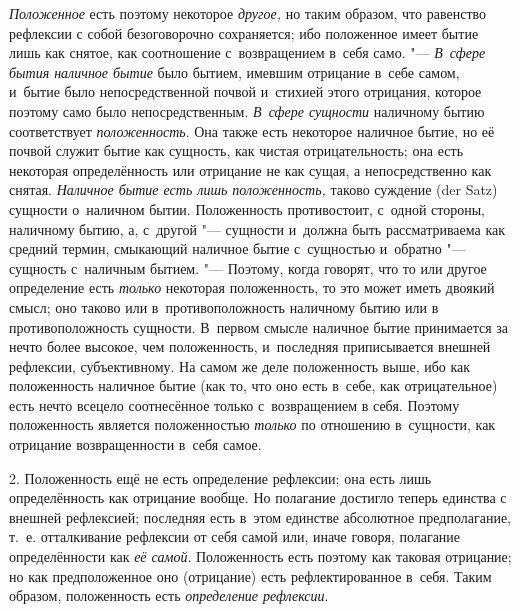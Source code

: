{\em Положенное} есть поэтому некоторое
{\em другое,} но таким образом, что равенство рефлексии
с собой безоговорочно сохраняется; ибо положенное имеет бытие лишь как
снятое, как соотношение с~возвращением в~себя само. "---
{\em В~сфере бытия наличное бытие} было бытием, имевшим
отрицание в~себе самом, и~бытие было непосредственной почвой и~стихией
этого отрицания, которое поэтому само было непосредственным.
{\em В~сфере сущности} наличному бытию соответствует
{\em положенность}. Она также есть некоторое наличное
бытие, но её почвой служит бытие как сущность, как чистая отрицательность;
она есть некоторая определённость или отрицание не как сущая, а
непосредственно как снятая. {\em Наличное бытие есть
лишь положенность,} таково суждение (der Satz) сущности о~наличном бытии.
Положенность противостоит, с~одной стороны, наличному бытию, а, с~другой
"--- сущности и~должна быть рассматриваема как средний термин, смыкающий
наличное бытие с~сущностью и~обратно "--- сущность с~наличным бытием. "---
Поэтому, когда говорят, что то или другое определение есть
{\em только} некоторая положенность, то это может иметь
двоякий смысл; оно таково или в~противоположность наличному бытию или в
противоположность сущности. В~первом смысле наличное бытие принимается за
нечто более высокое, чем положенность, и~последняя приписывается внешней
рефлексии, субъективному. На самом же деле положенность выше, ибо как
положенность наличное бытие (как то, что оно есть в~себе, как
отрицательное) есть нечто всецело соотнесённое только с~возвращением в
себя. Поэтому положенность является положенностью
{\em только} по отношению в~сущности, как отрицание
возвращенности в~себя самое.

2. Положенность ещё не есть определение рефлексии; она есть лишь
определённость как отрицание вообще. Но полагание достигло теперь единства
с внешней рефлексией; последняя есть в~этом единстве абсолютное
предполагание, т.~е. отталкивание рефлексии от себя самой или, иначе
говоря, полагание определённости как {\em её самой}.
Положенность есть поэтому как таковая отрицание; но как предположенное оно
(отрицание) есть рефлектированное в~себя. Таким образом, положенность есть
{\em определение рефлексии}.


